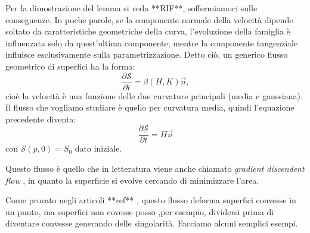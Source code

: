 Per la dimostrazione del lemma si veda **RIF**, soffermiamoci sulle conseguenze.
In poche parole, se la componente normale della velocità dipende soltato da caratteristiche geometriche della curva, l'evoluzione della famiglia è influenzata solo da quest'ultima componente; mentre la componente tangenziale influisce esclusivamente sulla parametrizzazione.
Detto ciò, un generico flusso geometrico di superfici ha la forma:
\[
\frac{\partial\mathcal{S}}{\partial t} = \beta(H,K)\vec{n},
\] 
cioè la velocità è una funzione delle due curvature principali (media e gaussiana). Il flusso che vogliamo studiare è quello per curvatura media, quindi l'equazione precedente diventa:
\begin{equation}
  \label{eq:cp-123}
  \frac{\partial\mathcal{S}}{\partial t} = H\vec{n}
\end{equation}
con $\mathcal{S}(p,0)=S_0$ dato iniziale.
\begin{osservazione}
Questo flusso è quello che in letteratura viene anche chiamato \emph{gradient discendent flow} , in quanto la superficie si evolve cercando di minimizzare l'area. 
\end{osservazione}
\begin{osservazione}
Come provato negli articoli **ref** , questo flusso deforma superfici convesse in un punto, ma superfici non covesse posso ,per esempio, dividersi prima di diventare convesse generando delle singolarità. Facciamo alcuni semplici esempi.
\end{osservazione}

